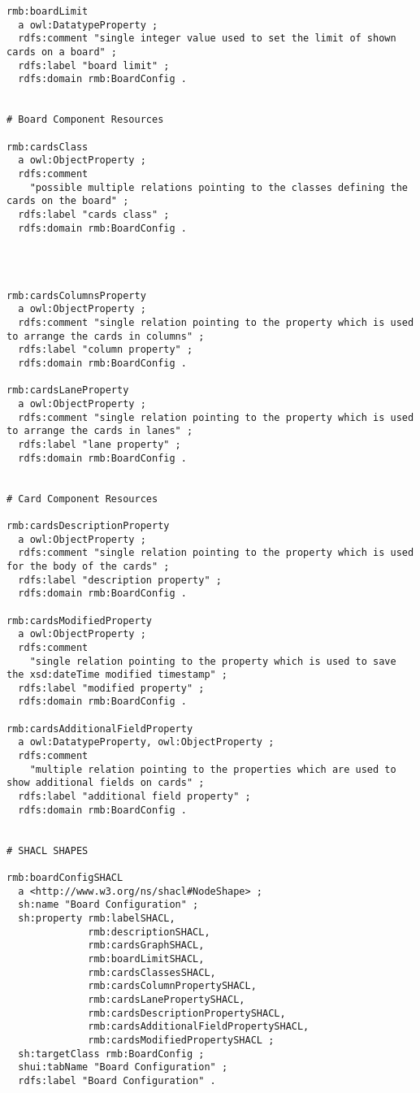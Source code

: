 \begin{spacing}{0.9}
\begin{lstlisting}
rmb:boardLimit
  a owl:DatatypeProperty ;
  rdfs:comment "single integer value used to set the limit of shown cards on a board" ;
  rdfs:label "board limit" ;
  rdfs:domain rmb:BoardConfig .


# Board Component Resources

rmb:cardsClass
  a owl:ObjectProperty ;
  rdfs:comment
    "possible multiple relations pointing to the classes defining the cards on the board" ;
  rdfs:label "cards class" ;
  rdfs:domain rmb:BoardConfig .




rmb:cardsColumnsProperty
  a owl:ObjectProperty ;
  rdfs:comment "single relation pointing to the property which is used to arrange the cards in columns" ;
  rdfs:label "column property" ;
  rdfs:domain rmb:BoardConfig .

rmb:cardsLaneProperty
  a owl:ObjectProperty ;
  rdfs:comment "single relation pointing to the property which is used to arrange the cards in lanes" ;
  rdfs:label "lane property" ;
  rdfs:domain rmb:BoardConfig .
  
  
# Card Component Resources

rmb:cardsDescriptionProperty
  a owl:ObjectProperty ;
  rdfs:comment "single relation pointing to the property which is used for the body of the cards" ;
  rdfs:label "description property" ;
  rdfs:domain rmb:BoardConfig .

rmb:cardsModifiedProperty
  a owl:ObjectProperty ;
  rdfs:comment
    "single relation pointing to the property which is used to save the xsd:dateTime modified timestamp" ;
  rdfs:label "modified property" ;
  rdfs:domain rmb:BoardConfig .

rmb:cardsAdditionalFieldProperty
  a owl:DatatypeProperty, owl:ObjectProperty ;
  rdfs:comment
    "multiple relation pointing to the properties which are used to show additional fields on cards" ;
  rdfs:label "additional field property" ;
  rdfs:domain rmb:BoardConfig .


# SHACL SHAPES

rmb:boardConfigSHACL
  a <http://www.w3.org/ns/shacl#NodeShape> ;
  sh:name "Board Configuration" ;
  sh:property rmb:labelSHACL,
              rmb:descriptionSHACL,
              rmb:cardsGraphSHACL,
              rmb:boardLimitSHACL,
              rmb:cardsClassesSHACL,
              rmb:cardsColumnPropertySHACL,
              rmb:cardsLanePropertySHACL,
              rmb:cardsDescriptionPropertySHACL,
              rmb:cardsAdditionalFieldPropertySHACL,
              rmb:cardsModifiedPropertySHACL ;
  sh:targetClass rmb:BoardConfig ;
  shui:tabName "Board Configuration" ;
  rdfs:label "Board Configuration" .


\end{lstlisting}
\end{spacing}
